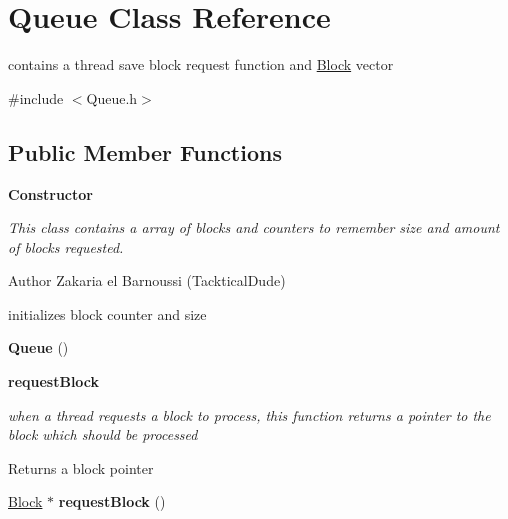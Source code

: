 \hypertarget{class_queue}{}\section{Queue Class Reference}
\label{class_queue}


contains a thread save block request function and \hyperlink{class_block}{Block} vector  




{\ttfamily \#include $<$Queue.\+h$>$}

\subsection*{Public Member Functions}
\begin{Indent}{\bf Constructor}\par
{\em This class contains a array of blocks and counters to remember size and amount of blocks requested.

\begin{DoxyAuthor}{Author}
Zakaria el Barnoussi (Tacktical\+Dude)
\end{DoxyAuthor}
initializes block counter and size }\begin{DoxyCompactItemize}
\item 
\hypertarget{class_queue_a7cfca3637d57c4a9e37351b3426ffd40}{}{\bfseries Queue} ()\label{class_queue_a7cfca3637d57c4a9e37351b3426ffd40}

\end{DoxyCompactItemize}
\end{Indent}
\begin{Indent}{\bf request\+Block}\par
{\em when a thread requests a block to process, this function returns a pointer to the block which should be processed

\begin{DoxyReturn}{Returns}
a block pointer 
\end{DoxyReturn}
}\begin{DoxyCompactItemize}
\item 
\hypertarget{class_queue_a394716099a2af0b27cf915905b8567c2}{}\hyperlink{class_block}{Block} $\ast$ {\bfseries request\+Block} ()\label{class_queue_a394716099a2af0b27cf915905b8567c2}

\end{DoxyCompactItemize}
\end{Indent}
